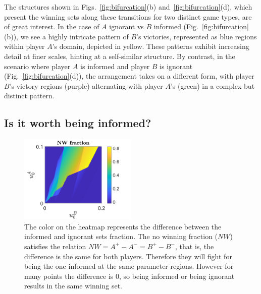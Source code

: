 The structures shown in Figs.~\ref{fig:bifurcation}(b) and~\ref{fig:bifurcation}(d), which present the winning sets along these transitions for two distinct game types, are of great interest. In the case of $A$ ignorant vs $B$ informed (Fig.~\ref{fig:bifurcation}(b)), we see a highly intricate pattern of $B$’s victories, represented as blue regions within player $A$’s domain, depicted in yellow. These patterns exhibit increasing detail at finer scales, hinting at a self-similar structure. By contrast, in the scenario where player $A$ is informed and player $B$ is ignorant (Fig.~\ref{fig:bifurcation}(d)), the arrangement takes on a different form, with player $B$’s victory regions (purple) alternating with player $A$’s (green) in a complex but distinct pattern.






\subsection{Is it worth being informed?}


\begin{figure}
    \centering
    \includegraphics[trim={0cm 0cm 0cm 0cm}, clip,width=0.5\textwidth ]{Images/P5/diferencia.png}
    \caption{The color on the heatmap represents the difference between the informed and ignorant sets fraction. The no winning fraction ($NW$) satisfies the relation $NW = A^{+} - A^{-} = B^{+} - B^{-}$, that is, the difference is the same for both players. Therefore they will fight for being the one informed at the same parameter regions. However for many points the difference is $0$, so being informed or being ignorant results in the same winning set.}
    \label{fig:diferencia}
\end{figure}


